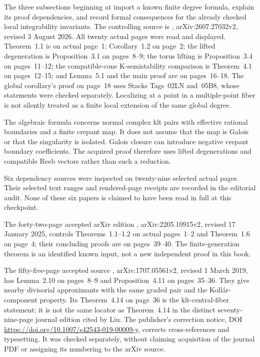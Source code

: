The three subsections beginning at
 import a known
finite degree formula, explain its proof dependencies, and
record formal consequences for the already checked local
integrability invariants. The controlling source is
\cite{Liu26FiniteDegreeV2}, arXiv:2607.27032v2,
revised 3 August 2026. All twenty actual pages were read
and displayed. Theorem~1.1 is on actual page~1;
Corollary~1.2 on page~2; the lifted degeneration is
Proposition~3.1 on pages~8--9; the torus lifting is
Proposition~3.4 on pages~11--12; the compatible-cone
K-semistability comparison is Theorem~4.1 on pages~12--15;
and Lemma~5.1 and the main proof are on pages~16--18.
The global corollary's proof on page~18 uses Stacks
Tags~02LN and~05B8, whose statements were checked
separately. Localizing at a point in a multiple-point
fiber is not silently treated as a finite local extension
of the same global degree.

The algebraic formula concerns normal complex klt pairs
with effective rational boundaries and a finite crepant
map. It does not assume that the map is Galois or that
the singularity is isolated. Galois closure can introduce
negative crepant boundary coefficients. The acquired
proof therefore uses lifted degenerations and compatible
Reeb vectors rather than such a reduction.

Six dependency sources were inspected on twenty-nine
selected actual pages. Their selected text ranges and
rendered-page receipts are recorded in the editorial
audit. None of these six papers is claimed to have been
read in full at this checkpoint.

The forty-two-page accepted arXiv edition
\cite{XuZhuang25StableDegV2}, arXiv:2205.10915v2,
revised 17 January 2025, controls Theorems~1.1--1.2
on actual pages~1--2 and Theorem~1.6 on page~4;
their concluding proofs are on pages~39--40. The
finite-generation theorem is an identified known input,
not a new independent proof in this book.

The fifty-five-page accepted source
\cite{LiXu19HigherRankV2}, arXiv:1707.05561v2,
revised 1 March 2019, has Lemma~2.10 on pages~8--9
and Proposition~4.11 on pages~35--36. They give
nearby divisorial approximants with the same graded
pair and the Koll\'ar-component property. Its
Theorem~4.14 on page~36 is the klt-central-fiber
statement; it is not the same locator as Theorem~4.14
in the distinct seventy-nine-page journal edition
cited by Liu. The publisher's correction notice,
DOI \url{https://doi.org/10.1007/s42543-019-00009-y},
corrects cross-references and typesetting. It was
checked separately, without claiming acquisition
of the journal PDF or assigning its numbering to
the arXiv source.

